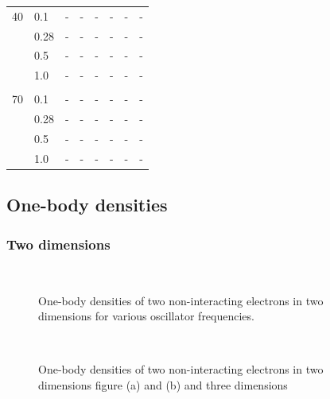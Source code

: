 \begin{table} [H]
\begin{tabularx}{\textwidth}{l:l|XXXXXX}
		40 & 0.1 & - & - & - & - & - & -\\ 
		& 0.28 & - & - & - & - & - & -\\
		& 0.5 & - & - & - & - & - & -\\
		& 1.0 & - & - & - & - & - & -\\ \hdashline \\
		
		70 & 0.1 & - & - & - & - & - & -\\ 
		& 0.28 & - & - & - & - & - & -\\
		& 0.5 & - & - & - & - & - & -\\
		& 1.0 & - & - & - & - & - & -\\ \hline\hline
	\end{tabularx}
\end{table}

\subsection{One-body densities}
\subsubsection{Two dimensions}
\begin{figure} [H]%
	\centering
	\\
	
	\caption{One-body densities of two non-interacting electrons in two dimensions for various oscillator frequencies.}%
	\label{fig:OB_interaction_2P_2D}
\end{figure}

\begin{figure} [H]%
	\centering
	\\
	
	\caption{One-body densities of two non-interacting electrons in two dimensions figure (a) and (b) and three dimensions}%
	\label{fig:OB_interaction_6P_2D}
\end{figure}

